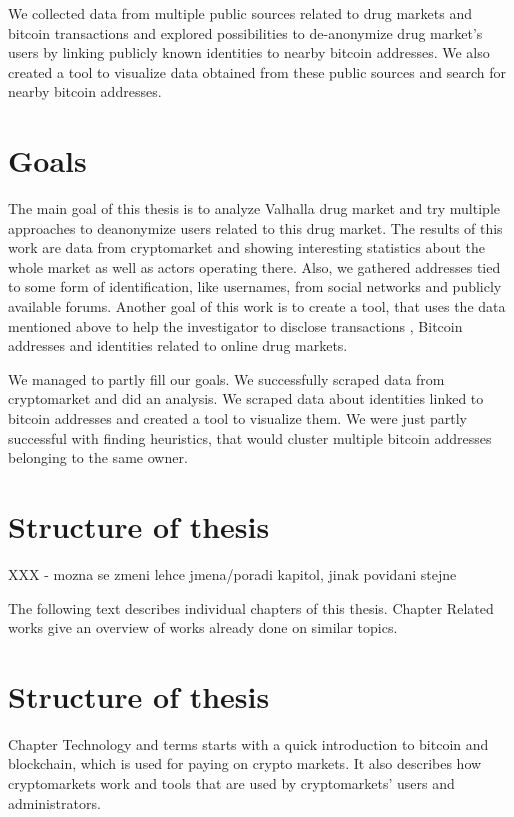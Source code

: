 \documentclass[
  digital, %
  table,   %
  lof,     %
  lot,     %
  oneside
]{fithesis3}
\begin{document}
We collected data from multiple public sources related to drug markets and bitcoin transactions and explored
 possibilities to de-anonymize drug market's users by linking publicly known identities to nearby bitcoin addresses.
We also created a tool to visualize data obtained from these public sources and search for nearby bitcoin addresses.

\section{Goals}

The main goal of this thesis is to analyze Valhalla drug market
and try multiple approaches to deanonymize users related to this drug market.
The results of this work are data from cryptomarket and
 showing interesting statistics about the whole market as well as actors operating there.
 Also, we gathered addresses tied to some form of identification, like usernames, from social networks and publicly available forums.
Another goal of this work is to create a tool, that uses the data mentioned above to help the investigator to disclose transactions
, Bitcoin addresses and identities related to online drug markets.

We managed to partly fill our goals. We successfully scraped data from cryptomarket and did an analysis.
We scraped data about identities linked to bitcoin addresses and created a tool to visualize them.
We were just partly successful with finding heuristics, that would cluster multiple bitcoin addresses belonging to the
same owner.

\section{Structure of thesis}
XXX - mozna se zmeni lehce jmena/poradi kapitol, jinak povidani stejne

The following text describes individual chapters of this thesis.
Chapter Related works give an overview of works already done on similar topics. 

\section{Structure of thesis}

Chapter Technology and terms starts with a quick introduction to bitcoin and blockchain,
which is used for paying on crypto markets.
It also describes how cryptomarkets work and tools that are used by cryptomarkets' users and administrators.
\end{document}
